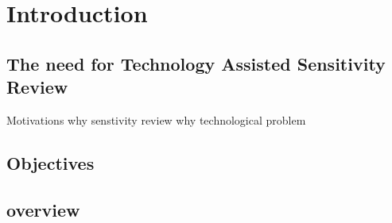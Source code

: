 \documentclass{l4proj}
\begin{document}
%
%
%
%
%
%
%
%
\chapter{Introduction}


\section{The need for Technology Assisted Sensitivity Review}



Motivations
why senstivity review
why technological problem



\section{Objectives}



\section{overview}
\end{document}
